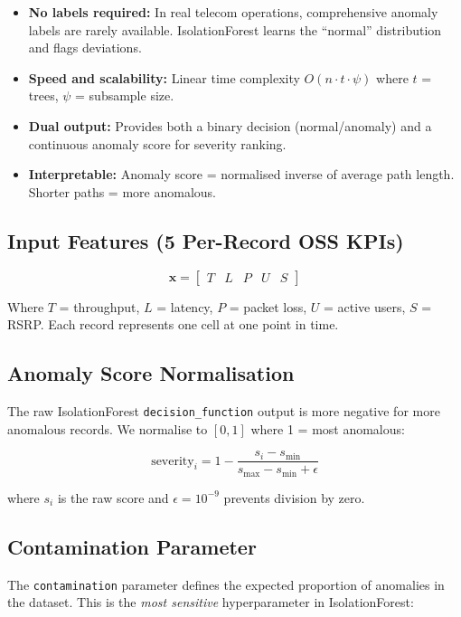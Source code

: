\begin{itemize}
  \item \textbf{No labels required:} In real telecom operations, comprehensive anomaly labels are rarely available. IsolationForest learns the ``normal'' distribution and flags deviations.
  \item \textbf{Speed and scalability:} Linear time complexity $O(n \cdot t \cdot \psi)$ where $t$ = trees, $\psi$ = subsample size.
  \item \textbf{Dual output:} Provides both a binary decision (normal/anomaly) and a continuous anomaly score for severity ranking.
  \item \textbf{Interpretable:} Anomaly score = normalised inverse of average path length. Shorter paths = more anomalous.
\end{itemize}

\subsection{Input Features (5 Per-Record OSS KPIs)}

$$\mathbf{x} = \begin{bmatrix} T & L & P & U & S \end{bmatrix}$$

Where $T$ = throughput, $L$ = latency, $P$ = packet loss, $U$ = active users, $S$ = RSRP. Each record represents one cell at one point in time.

\subsection{Anomaly Score Normalisation}

The raw IsolationForest \texttt{decision\_function} output is more negative for more anomalous records. We normalise to $[0, 1]$ where 1 = most anomalous:

$$\text{severity}_i = 1 - \frac{s_i - s_{\min}}{s_{\max} - s_{\min} + \epsilon}$$

where $s_i$ is the raw score and $\epsilon = 10^{-9}$ prevents division by zero.

\subsection{Contamination Parameter}

The \texttt{contamination} parameter defines the expected proportion of anomalies in the dataset. This is the \emph{most sensitive} hyperparameter in IsolationForest:

